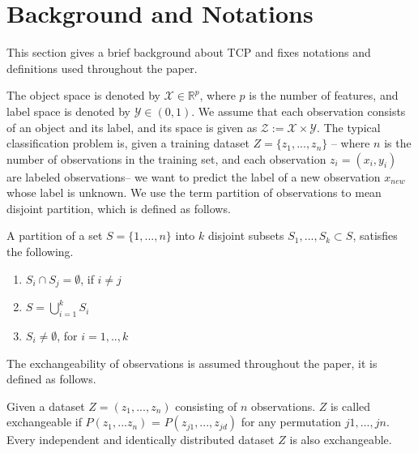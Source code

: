 \documentclass[main]{subfiles}
\begin{document}
\section{Background and Notations}
This section gives a brief background about TCP and fixes notations and definitions used throughout the paper.

The object space is denoted by $\mathcal{X} \in \mathbb{R}^p$, where $p$ is the number of features, and  label space is denoted by $\mathcal{Y} \in (0,1)$. We assume that each observation consists of an object and its label, and its space is given as $\mathcal{Z} := \mathcal{X} \times \mathcal{Y}$. %
The typical classification problem is, given a training dataset $Z = \{ z_1 , ..., z_n \} $ -- where $n$ is the number of observations in the training set, and each observation $z_i = (x_i, y_i)$ are labeled observations-- we want to predict the label of a new observation $x_{new}$ whose label is unknown. We use the term partition of observations to mean disjoint partition, which is defined as follows.


\begin{definition} 
A partition of a set $S = \{ 1,...,n\}$ into $k$ disjoint subsets $S_1, ..., S_k \subset S$, satisfies the following.
\begin{enumerate}
\item $S_i \cap S_j = \emptyset$, if $i \neq j$
\item $S = \bigcup_{i=1}^k S_i$
\item $ S_i \neq \emptyset$, for $i={1,..,k}$
\end{enumerate}
\end{definition}

The exchangeability of observations is assumed throughout the paper, it is defined as follows.
\begin{definition} [Exchangeability]
Given a dataset $Z= (z_1, ..., z_n)$ consisting of $n$ observations. $Z$ is called exchangeable if $P(z_1,...z_n)$ = $P(z_{j1},...,z_{jd})$ for any permutation $j1,...,jn$. Every independent and identically distributed dataset $Z$ is  also exchangeable. 
\end{definition}
\end{document}
